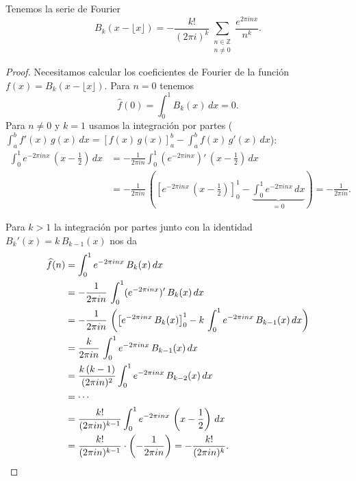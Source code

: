 \begin{proposicion}
  Tenemos la serie de Fourier
  \begin{equation}
    \label{eq:serie-de-Fourier-polinomios-de-Bernoulli}
    B_k (x - \lfloor x\rfloor) = -\frac{k!}{(2\pi i)^k}\sum_{\substack{n\in \mathbb{Z} \\ n \ne 0}} \frac{e^{2\pi i n x}}{n^k}.
  \end{equation}

  \begin{proof}
    Necesitamos calcular los coeficientes de Fourier de la función
    $f (x) = B_k (x - \lfloor x\rfloor)$. Para $n = 0$ tenemos
    $$\widehat{f} (0) = \int_0^1 B_k (x)\,dx = 0.$$
    Para $n \ne 0$ y $k = 1$ usamos la integración por partes
    ($\int_a^b f'(x)\,g(x)\,dx = \left[f(x)\,g(x)\right]_a^b - \int_a^b f(x) \, g'(x)\,dx$):
    \begin{align*}
      \int_0^1 e^{-2\pi i n x}\,\left(x - \frac{1}{2}\right)\,dx & = -\frac{1}{2\pi i n} \int_0^1 \left(e^{-2\pi i n x}\right)' \, \left(x - \frac{1}{2}\right)\,dx \\
      & = -\frac{1}{2\pi i n} \, \left( \left[e^{-2\pi i n x}\,\left(x - \frac{1}{2}\right)\right]^1_0 - \underbrace{\int_0^1 e^{-2\pi i n x}\,dx}_{=0} \right) = -\frac{1}{2\pi i n}.
    \end{align*}

    Para $k > 1$ la integración por partes junto con la identidad
    $B_k' (x) = k\,B_{k-1} (x)$ nos da
    \begin{align*}
      \widehat{f} (n) & = \int_0^1 e^{-2\pi i n x} \, B_k (x)\,dx \\
      & = -\frac{1}{2\pi i n}\,\int_0^1 (e^{-2\pi i n x})' \, B_k (x)\,dx \\
      & = -\frac{1}{2\pi i n}\,\left(\left[e^{-2\pi i n x}\,B_k (x)\right]_0^1 - k\,\int_0^1 e^{-2\pi i n x} \, B_{k-1} (x)\,dx\right) \\
      & = \frac{k}{2\pi i n} \, \int_0^1 e^{-2\pi i n x}\,B_{k-1} (x)\,dx \\
      & = \frac{k\,(k-1)}{(2\pi i n)^2} \int_0^1 e^{-2\pi i n x}\,B_{k-2} (x)\,dx \\
      & = \cdots \\
      & = \frac{k!}{(2\pi i n)^{k-1}} \int_0^1 e^{-2\pi i n x}\,\left(x - \frac{1}{2}\right)\,dx \\
      & = \frac{k!}{(2\pi i n)^{k-1}} \cdot \left(-\frac{1}{2\pi i n}\right) = -\frac{k!}{(2\pi i n)^k}. \qedhere
    \end{align*}
  \end{proof}
\end{proposicion}

